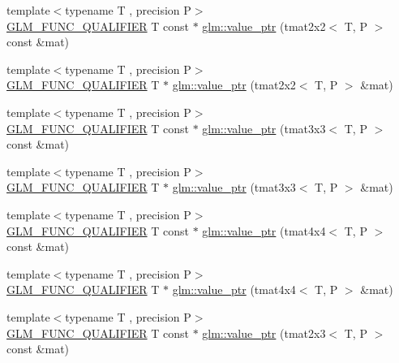 \begin{DoxyCompactItemize}
\item 
{\footnotesize template$<$typename T , precision P$>$ }\\\mbox{\hyperlink{setup_8hpp_a33fdea6f91c5f834105f7415e2a64407}{G\+L\+M\+\_\+\+F\+U\+N\+C\+\_\+\+Q\+U\+A\+L\+I\+F\+I\+ER}} T const  $\ast$ \mbox{\hyperlink{group__gtc__type__ptr_ga2d709523aa0beb0a42433f80c9d07718}{glm\+::value\+\_\+ptr}} (tmat2x2$<$ T, P $>$ const \&mat)
\item 
{\footnotesize template$<$typename T , precision P$>$ }\\\mbox{\hyperlink{setup_8hpp_a33fdea6f91c5f834105f7415e2a64407}{G\+L\+M\+\_\+\+F\+U\+N\+C\+\_\+\+Q\+U\+A\+L\+I\+F\+I\+ER}} T $\ast$ \mbox{\hyperlink{group__gtc__type__ptr_gac7256e14328e818e61276fa5e6176b9d}{glm\+::value\+\_\+ptr}} (tmat2x2$<$ T, P $>$ \&mat)
\item 
{\footnotesize template$<$typename T , precision P$>$ }\\\mbox{\hyperlink{setup_8hpp_a33fdea6f91c5f834105f7415e2a64407}{G\+L\+M\+\_\+\+F\+U\+N\+C\+\_\+\+Q\+U\+A\+L\+I\+F\+I\+ER}} T const  $\ast$ \mbox{\hyperlink{group__gtc__type__ptr_ga0fd20ac385befba86cf2bbf836728bc2}{glm\+::value\+\_\+ptr}} (tmat3x3$<$ T, P $>$ const \&mat)
\item 
{\footnotesize template$<$typename T , precision P$>$ }\\\mbox{\hyperlink{setup_8hpp_a33fdea6f91c5f834105f7415e2a64407}{G\+L\+M\+\_\+\+F\+U\+N\+C\+\_\+\+Q\+U\+A\+L\+I\+F\+I\+ER}} T $\ast$ \mbox{\hyperlink{group__gtc__type__ptr_ga4470e16d0e844cb2c4f7b2e731824f87}{glm\+::value\+\_\+ptr}} (tmat3x3$<$ T, P $>$ \&mat)
\item 
{\footnotesize template$<$typename T , precision P$>$ }\\\mbox{\hyperlink{setup_8hpp_a33fdea6f91c5f834105f7415e2a64407}{G\+L\+M\+\_\+\+F\+U\+N\+C\+\_\+\+Q\+U\+A\+L\+I\+F\+I\+ER}} T const  $\ast$ \mbox{\hyperlink{group__gtc__type__ptr_ga2edadf5433694bf018d62db962b61321}{glm\+::value\+\_\+ptr}} (tmat4x4$<$ T, P $>$ const \&mat)
\item 
{\footnotesize template$<$typename T , precision P$>$ }\\\mbox{\hyperlink{setup_8hpp_a33fdea6f91c5f834105f7415e2a64407}{G\+L\+M\+\_\+\+F\+U\+N\+C\+\_\+\+Q\+U\+A\+L\+I\+F\+I\+ER}} T $\ast$ \mbox{\hyperlink{group__gtc__type__ptr_ga1fc49ab60e5afdd4821a6903e92244a4}{glm\+::value\+\_\+ptr}} (tmat4x4$<$ T, P $>$ \&mat)
\item 
{\footnotesize template$<$typename T , precision P$>$ }\\\mbox{\hyperlink{setup_8hpp_a33fdea6f91c5f834105f7415e2a64407}{G\+L\+M\+\_\+\+F\+U\+N\+C\+\_\+\+Q\+U\+A\+L\+I\+F\+I\+ER}} T const  $\ast$ \mbox{\hyperlink{group__gtc__type__ptr_ga968f2c8899914ea1c1daaaded8daa6b5}{glm\+::value\+\_\+ptr}} (tmat2x3$<$ T, P $>$ const \&mat)

\end{DoxyCompactItemize}
